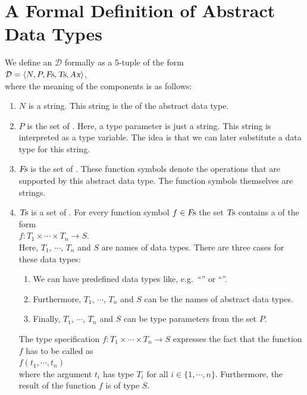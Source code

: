 \section[Formal Definition]{A Formal Definition of Abstract Data Types}
We define an  $\mathcal{D}$ formally as a 5-tuple of the form 
\\[0.2cm]
\hspace*{1.3cm}
 $\mathcal{D} = \langle N, P, \textsl{Fs}, \textsl{Ts}, \textsl{Ax} \rangle$,
\\[0.2cm] 
where the meaning of the components is as follows:
\begin{enumerate}
\item $N$ is a string.  This string is the  of the abstract data type. 
\item $P$ is the set of .   Here, a type parameter is just a string.
      This string is interpreted as a type variable.  The idea is that we can later substitute 
      a data type for this string. 
\item $\textsl{Fs}$ is the set of .  These function symbols denote the 
      operations that are supported by this abstract data type. The function symbols themselves are strings.
\item $\textsl{Ts}$ is a set of .  For every function symbol
      $f \in \textsl{Fs}$
      the set $\textsl{Ts}$ contains a  of the form 
      \\[0.2cm]
      \hspace*{1.3cm} 
      $f: T_1 \times \cdots \times T_n \rightarrow S$. 
      \\[0.2cm]
      Here,  $T_1$, $\cdots$, $T_n$ and $S$ are names of data types.  There are three cases for
      these data types: 
      \begin{enumerate}
      \item We can have predefined data types like, e.g.~``'' or ``''.
      \item Furthermore, $T_1$, $\cdots$, $T_n$ and $S$ can be the names of abstract data types.
      \item Finally,  $T_1$, $\cdots$, $T_n$ and $S$ can be type parameters from the set $P$.
      \end{enumerate}
      The type specification $f: T_1 \times \cdots \times T_n \rightarrow S$ expresses the fact that
      the function $f$ has to be called as \\[0.2cm] 
      \hspace*{1.3cm}
      $f(t_1,\cdots,t_n)$ 
      \\[0.2cm]
      where the argument $t_i$ has type $T_i$ for all $i \in \{1,\cdots,n\}$.
      Furthermore, the result of the function $f$ is of type $S$.


\end{enumerate}
